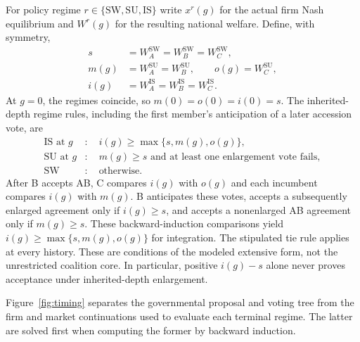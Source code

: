 \documentclass[11pt,a4paper]{article}
\theoremstyle{remark}\newtheorem{remark}[theorem]{Remark}
\newcommand{\SW}{\mathrm{SW}}\newcommand{\SU}{\mathrm{SU}}\newcommand{\IS}{\mathrm{IS}}
\begin{document}
For policy regime $r\in\{\SW,\SU,\IS\}$ write $x^r(g)$ for the actual firm Nash equilibrium and $W^r(g)$ for the resulting national welfare. Define, with symmetry,
\begin{align}\label{eq:payoffs}
s&=W_A^{\SW}=W_B^{\SW}=W_C^{\SW},\nonumber\\
m(g)&=W_A^{\SU}=W_B^{\SU},\qquad o(g)=W_C^{\SU},\nonumber\\
i(g)&=W_A^{\IS}=W_B^{\IS}=W_C^{\IS}.
\end{align}
At $g=0$, the regimes coincide, so $m(0)=o(0)=i(0)=s$. The inherited-depth regime rules, including the first member's anticipation of a later accession vote, are
\begin{align}\label{eq:consent}
\IS\text{ at }g &: \quad i(g)\ge\max\{s,m(g),o(g)\},\\
\SU\text{ at }g &: \quad m(g)\ge s\text{ and at least one enlargement vote fails},\nonumber\\
\SW &: \quad\text{otherwise}.\nonumber
\end{align}
After B accepts AB, C compares $i(g)$ with $o(g)$ and each incumbent compares $i(g)$ with $m(g)$. B anticipates these votes, accepts a subsequently enlarged agreement only if $i(g)\ge s$, and accepts a nonenlarged AB agreement only if $m(g)\ge s$. These backward-induction comparisons yield $i(g)\ge\max\{s,m(g),o(g)\}$ for integration. The stipulated tie rule applies at every history. These are conditions of the modeled extensive form, not the unrestricted coalition core. In particular, positive $i(g)-s$ alone never proves acceptance under inherited-depth enlargement.

Figure~\ref{fig:timing} separates the governmental proposal and voting tree from the firm and market continuations used to evaluate each terminal regime. The latter are solved first when computing the former by backward induction.
\end{document}

